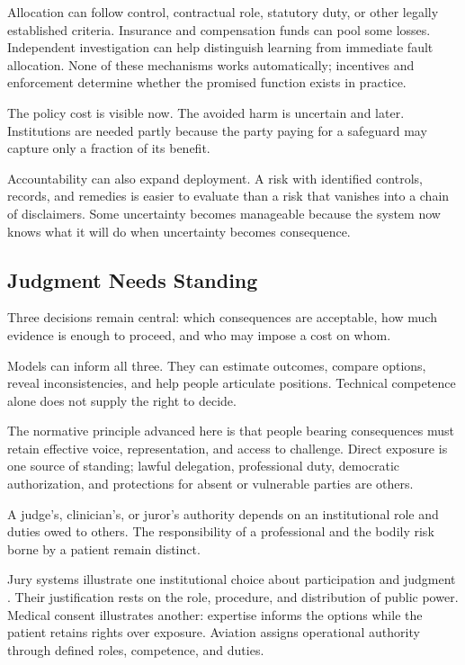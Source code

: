 Allocation can follow control, contractual role, statutory duty, or other legally established criteria. Insurance and compensation funds can pool some losses. Independent investigation can help distinguish learning from immediate fault allocation. None of these mechanisms works automatically; incentives and enforcement determine whether the promised function exists in practice.

The policy cost is visible now. The avoided harm is uncertain and later. Institutions are needed partly because the party paying for a safeguard may capture only a fraction of its benefit.

Accountability can also expand deployment. A risk with identified controls, records, and remedies is easier to evaluate than a risk that vanishes into a chain of disclaimers. Some uncertainty becomes manageable because the system now knows what it will do when uncertainty becomes consequence.

\subsection{Judgment Needs Standing}

Three decisions remain central: which consequences are acceptable, how much evidence is enough to proceed, and who may impose a cost on whom.

Models can inform all three. They can estimate outcomes, compare options, reveal inconsistencies, and help people articulate positions. Technical competence alone does not supply the right to decide.

The normative principle advanced here is that people bearing consequences must retain effective voice, representation, and access to challenge. Direct exposure is one source of standing; lawful delegation, professional duty, democratic authorization, and protections for absent or vulnerable parties are others.

A judge's, clinician's, or juror's authority depends on an institutional role and duties owed to others. The responsibility of a professional and the bodily risk borne by a patient remain distinct.

Jury systems illustrate one institutional choice about participation and judgment \cite{kalven1966american}. Their justification rests on the role, procedure, and distribution of public power. Medical consent illustrates another: expertise informs the options while the patient retains rights over exposure. Aviation assigns operational authority through defined roles, competence, and duties.

